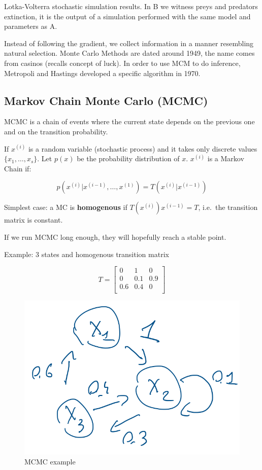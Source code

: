 Lotka-Volterra stochastic simulation results. In B we witness preys and
predators extinction, it is the output of a simulation performed with
the same model and parameters as A.

Instead of following the gradient, we collect information in a manner
resembling natural selection. Monte Carlo Methods are dated around 1949,
the name comes from casinos (recalls concept of luck). In order to use
MCM to do inference, Metropoli and Hastings developed a specific
algorithm in 1970.

\hypertarget{markov-chain-monte-carlo-mcmc}{%
\subsection{Markov Chain Monte Carlo
(MCMC)}\label{markov-chain-monte-carlo-mcmc}}

MCMC is a chain of events where the current state depends on the
previous one and on the transition probability.

If $x^{(i)}$ is a random variable (stochastic process) and it takes only
discrete values $\{x_1,\dots,x_s\}$. Let $p(x)$ be the probability
distribution of $x$. $x^{(i)}$ is a Markov Chain if:

$$
p(x^{(i)}|x^{(i-1)},\dots,x^{(1)})=T(x^{(i)}|x^{(i-1)})
$$

Simplest case: a MC is \textbf{homogenous} if $T(x^{(i)})x^{(i-1)}=T$,
i.e.~the transition matrix is constant.

If we run MCMC long enough, they will hopefully reach a stable point.

Example: 3 states and homogenous transition matrix

$$
T = \begin{bmatrix}
0 & 1 & 0\\
0 & 0.1 & 0.9\\ 0.6 & 0.4 & 0\\
\end{bmatrix}
$$

\begin{figure}
\centering
\includegraphics{mcmc.png}
\caption{MCMC example}
\end{figure}

